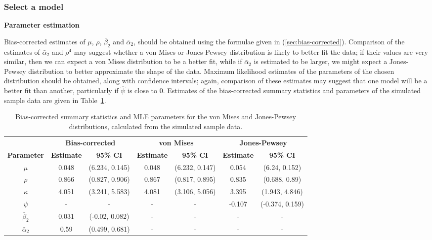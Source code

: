 \documentclass[../../ArchStats.tex]{subfiles}
\begin{document}
\subsubsection{Select a model}
\label{sssec:model-selection}

\textbf{Parameter estimation}

Bias-corrected estimates of $\mu$, $\rho$, $\bar{\beta}_2$ and $\bar{\alpha}_2$, should be obtained using the formulae given in (\ref{sec:bias-corrected}). Comparison of the estimates of $\bar{\alpha}_2$ and $\rho^4$ may suggest whether a von Mises or Jones-Pewsey distribution is likely to better fit the data; if their values are very similar, then we can expect a von Mises distribution to be a better fit, while if $\bar{\alpha}_2$ is estimated to be larger, we might expect a Jones-Pewsey distribution to better approximate the shape of the data. Maximum likelihood estimates of the parameters of the chosen distribution should be obtained, along with confidence intervals; again, comparison of these estimates may suggest that one model will be a better fit than another, particularly if $\hat{\psi}$ is close to 0. Estimates of the bias-corrected summary statistics and parameters of the simulated sample data are given in Table~\ref{tab:sim-statistics}.

\begin{table}[!h]
\footnotesize
\centering
\caption{Bias-corrected summary statistics and MLE parameters for the von Mises and Jones-Pewsey distributions, calculated from the simulated sample data.}
\label{tab:sim-statistics}
\begin{tabular}{c|cc|cc|cc}
\hline 
 & \multicolumn{2}{c|}{\textbf{Bias-corrected}} & \multicolumn{2}{c|}{\textbf{von Mises}} & \multicolumn{2}{c}{\textbf{Jones-Pewsey}} \\
\textbf{Parameter} & \textbf{Estimate} & \textbf{95\% CI} & \textbf{Estimate} & \textbf{95\% CI} & \textbf{Estimate} & \textbf{95\% CI} \\
\hline
$\mu$ & 0.048 & (6.234, 0.145) & 0.048 & (6.232, 0.147) & 0.054 & (6.24, 0.152) \\ 
$\rho$ & 0.866 & (0.827, 0.906) & 0.867 & (0.817, 0.895) & 0.835 & (0.688, 0.89) \\ 
$\kappa$ & 4.051 & (3.241, 5.583) & 4.081 & (3.106, 5.056) & 3.395 & (1.943, 4.846) \\ 
$\psi$ & - & - & - & - & -0.107 & (-0.374, 0.159) \\ 
$\bar{\beta}_2$ & 0.031 & (-0.02, 0.082) & - & - & - & - \\ 
$\bar{\alpha}_2 $ & 0.59 & (0.499, 0.681) & - & - & - & - \\ 
\hline
\end{tabular}
\end{table}
\end{document}
